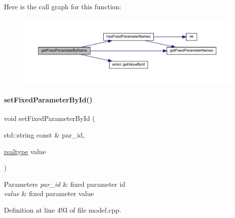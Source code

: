 Here is the call graph for this function\+:
\nopagebreak
\begin{figure}[H]
\begin{center}
\leavevmode
\includegraphics[width=350pt]{classamici_1_1_model_a99cc00a08b2f2d87d3eac047d00a7c57_cgraph}
\end{center}
\end{figure}
\mbox{\label{classamici_1_1_model_adc0d24343c6fed2e797fb402f7c2d256}} 
\paragraph{\texorpdfstring{set\+Fixed\+Parameter\+By\+Id()}{setFixedParameterById()}}
{\footnotesize\ttfamily void set\+Fixed\+Parameter\+By\+Id (\begin{DoxyParamCaption}\item[{std\+::string const \&}]{par\+\_\+id,  }\item[{\mbox{\hyperlink{namespaceamici_a1bdce28051d6a53868f7ccbf5f2c14a3}{realtype}}}]{value }\end{DoxyParamCaption})}


\begin{DoxyParams}{Parameters}
{\em par\+\_\+id} & fixed parameter id \\
\hline
{\em value} & fixed parameter value \\
\hline
\end{DoxyParams}


Definition at line 493 of file model.\+cpp.

